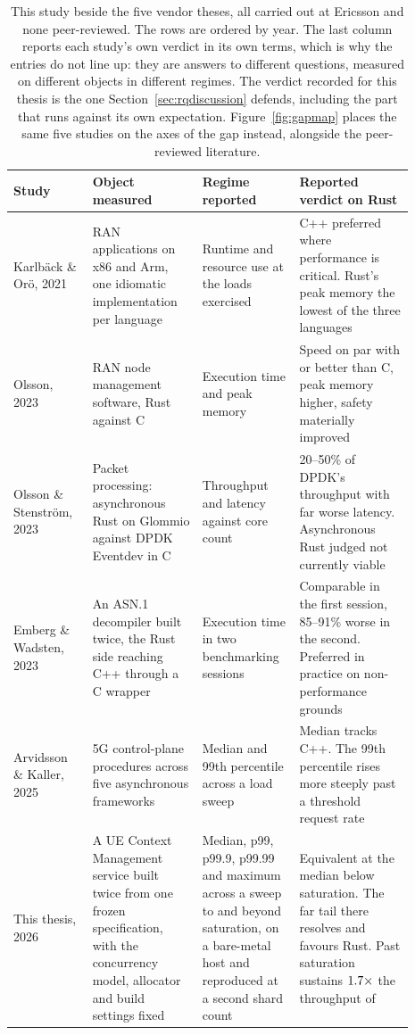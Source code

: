 \documentclass[english,oneside,a4paper,censored,csm,software-track-2020]{HYthesisML}
\renewcommand{\arraystretch}{0.95}
\begin{document}
\begin{table}[tp]
\centering
\small
\caption[This study beside the five vendor theses]{This study beside the five vendor theses, all
carried out at Ericsson and none peer-reviewed. The rows are ordered by year. The last column
reports each study's own verdict in its own terms, which is why the entries do not line up: they
are answers to different questions, measured on different objects in different regimes. The
verdict recorded for this thesis is the one Section~\ref{sec:rqdiscussion} defends, including the
part that runs against its own expectation. Figure~\ref{fig:gapmap} places the same five studies on
the axes of the gap instead, alongside the peer-reviewed
literature.\label{tab:vendortheses}}
\renewcommand{\arraystretch}{1.2}
\begin{tabular}{@{}R{0.18\linewidth} R{0.25\linewidth} R{0.20\linewidth} R{0.26\linewidth}@{}}
\hline\hline
Study & Object measured & Regime reported & Reported verdict on Rust \\
\hline
Karlb\"ack \& Or\"o, 2021~\cite{karlback2021ran} &
RAN applications on x86 and Arm, one idiomatic implementation per language &
Runtime and resource use at the loads exercised &
C++ preferred where performance is critical. Rust's peak memory the lowest of the three
languages \\
Olsson, 2023~\cite{olsson2023ranmgmt} &
RAN node management software, Rust against C &
Execution time and peak memory &
Speed on par with or better than C, peak memory higher, safety materially improved \\
Olsson \& Stenstr\"om, 2023~\cite{olsson2023asyncpackets} &
Packet processing: asynchronous Rust on Glommio against DPDK Eventdev in C &
Throughput and latency against core count &
20--50\% of DPDK's throughput with far worse latency. Asynchronous Rust judged not currently
viable \\
Emberg \& Wadsten, 2023~\cite{emberg2023asn1} &
An {ASN.1} decompiler built twice, the Rust side reaching C++ through a C wrapper &
Execution time in two benchmarking sessions &
Comparable in the first session, 85--91\% worse in the second. Preferred in practice on
non-performance grounds \\
Arvidsson \& Kaller, 2025~\cite{arvidsson2025async} &
5G control-plane procedures across five asynchronous frameworks &
Median and 99th percentile across a load sweep &
Median tracks C++. The 99th percentile rises more steeply past a threshold request rate \\
\hline
This thesis, 2026 &
A UE Context Management service built twice from one frozen specification, with the concurrency
model, allocator and build settings fixed &
Median, p99, p99.9, p99.99 and maximum across a sweep to and beyond saturation, on a bare-metal
host and reproduced at a second shard count &
Equivalent at the median below saturation. The far tail there resolves and favours Rust. Past
saturation \OverloadSustainedFaster{} sustains
$1.7\times$ the throughput of \OverloadSustainedSlower{} \\
\hline
\end{tabular}
\end{table}
\end{document}
